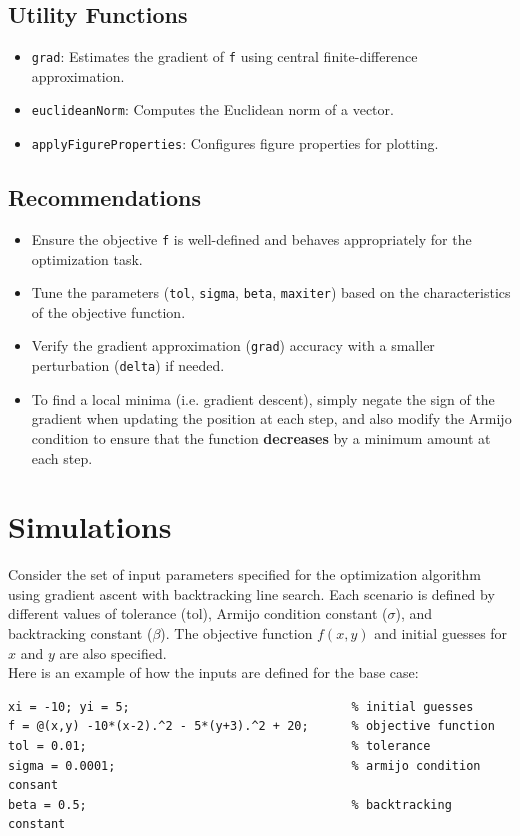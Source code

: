 \documentclass{article}
\newcommand{\mat}[1]{\lstinline[style=matlabstyle]|#1|}
\begin{document}
\subsection{Utility Functions}
\begin{itemize}
    \item \mat{grad}: Estimates the gradient of \mat{f} using central finite-difference approximation.
    \item \mat{euclideanNorm}: Computes the Euclidean norm of a vector.
    \item \mat{applyFigureProperties}: Configures figure properties for plotting.
\end{itemize}

\subsection{Recommendations}
\begin{itemize}
    \item Ensure the objective \mat{f} is well-defined and behaves appropriately for the optimization task.
    \item Tune the parameters (\mat{tol}, \mat{sigma}, \mat{beta}, \mat{maxiter}) based on the characteristics of the objective function.
    \item Verify the gradient approximation (\mat{grad}) accuracy with a smaller perturbation (\mat{delta}) if needed.
    \item To find a local minima (i.e. gradient descent), simply negate the sign of the gradient when updating the position at each step, and also modify the Armijo condition to ensure that the function \textbf{decreases} by a minimum amount at each step.
\end{itemize}

\section{Simulations}
Consider the set of input parameters specified for the optimization algorithm using gradient ascent with backtracking line search. Each scenario is defined by different values of tolerance (tol), Armijo condition constant ($\sigma$), and backtracking constant ($\beta$). The objective function $f(x,y)$ and initial guesses for $x$ and $y$ are also specified.
\\

Here is an example of how the inputs are defined for the base case:
\begin{lstlisting}[style=matlabstyle, caption = {Function Inputs}]
xi = -10; yi = 5;                               % initial guesses
f = @(x,y) -10*(x-2).^2 - 5*(y+3).^2 + 20;      % objective function
tol = 0.01;                                     % tolerance
sigma = 0.0001;                                 % armijo condition consant
beta = 0.5;                                     % backtracking constant
\end{lstlisting}
\end{document}
